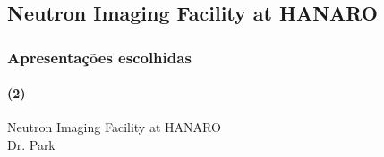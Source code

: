 \documentclass[svgnames,smaller,table]{beamer}
\begin{document}
\begin{frame}
  
\end{frame}

\begin{frame}
    
\end{frame}

\begin{frame}
  
\end{frame}

\begin{frame}
  
\end{frame}

\begin{frame}
  
\end{frame}

%  

\begin{frame}
  
\end{frame}

\begin{frame}
  
\end{frame}

\subsection{Neutron Imaging Facility at HANARO}
\begin{frame}
  \frametitle{Apresentações escolhidas}
  \framesubtitle{(2)}
  \begin{center}
    Neutron Imaging Facility at HANARO\\
    \vspace{2.0cm}
    Dr. Park
  \end{center}
\end{frame}


\begin{frame}
  
\end{frame}

\begin{frame}
  
\end{frame}
\end{document}
